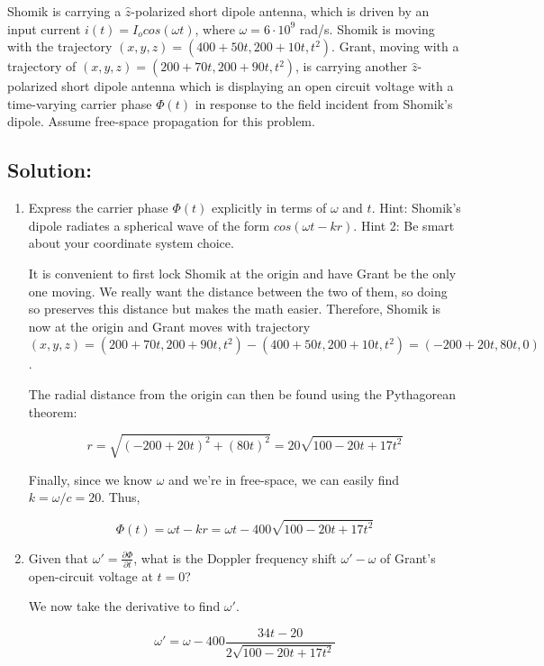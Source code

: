 \documentclass{article}
\begin{document}
Shomik is carrying a $\hat{z}$-polarized short dipole antenna, which is driven by an input current $i(t) = I_o cos(\omega t)$, where $\omega = 6 \cdot 10^9$ rad/s. Shomik is moving with the trajectory $(x, y, z) = (400 + 50t, 200 + 10t, t^2)$. Grant, moving with a trajectory of $(x, y, z) = (200 + 70t, 200 + 90t, t^2)$, is carrying another $\hat{z}$-polarized short dipole antenna which is displaying an open circuit voltage with a time-varying carrier phase $\Phi(t)$ in response to the field incident from Shomik's dipole. Assume free-space propagation for this problem.

\subsection{Solution:}

\begin{enumerate}[label=(\alph*)]
    \item Express the carrier phase $\Phi(t)$ explicitly in terms of $\omega$ and $t$. Hint: Shomik's dipole radiates a spherical wave of the form $cos(\omega t - kr)$. Hint 2: Be smart about your coordinate system choice.

    It is convenient to first lock Shomik at the origin and have Grant be the only one moving. We really want the distance between the two of them, so doing so preserves this distance but makes the math easier. Therefore, Shomik is now at the origin and Grant moves with trajectory $(x, y, z) = (200 + 70t, 200 + 90t, t^2) - (400 + 50t, 200 + 10t, t^2) = (-200 + 20t, 80t, 0)$.

    The radial distance from the origin can then be found using the Pythagorean theorem:

    $$r = \sqrt{(-200 + 20t)^2 + (80t)^2} = 20 \sqrt{100 - 20t + 17t^2}$$

    Finally, since we know $\omega$ and we're in free-space, we can easily find $k = \omega/c = 20$. Thus,

    $$\boxed{\Phi(t) = \omega t - kr = \omega t - 400 \sqrt{100 - 20t + 17t^2}}$$

    \vfill

    \item Given that $\omega' = \frac{\partial \Phi}{\partial t}$, what is the Doppler frequency shift $\omega' - \omega$ of Grant's open-circuit voltage at $t = 0$?

    We now take the derivative to find $\omega'$.

    $$\omega' = \omega - 400 \frac{34t - 20}{2\sqrt{100 - 20t + 17t^2}}$$


\end{enumerate}
\end{document}
